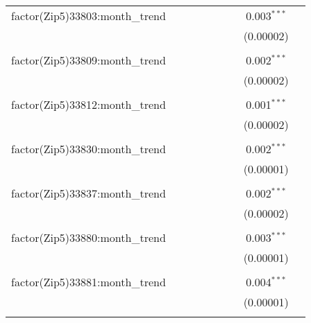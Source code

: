 \begin{table}[H]
{\begin{tabular}{@{\extracolsep{5pt}}lcccccccc}
  factor(Zip5)33803:month\_trend &  &  &  &  &  &  & 0.003$^{***}$ &  \\  

   &  &  &  &  &  &  & (0.00002) &  \\  

   & & & & & & & & \\  

  factor(Zip5)33809:month\_trend &  &  &  &  &  &  & 0.002$^{***}$ &  \\  

   &  &  &  &  &  &  & (0.00002) &  \\  

   & & & & & & & & \\  

  factor(Zip5)33812:month\_trend &  &  &  &  &  &  & 0.001$^{***}$ &  \\  

   &  &  &  &  &  &  & (0.00002) &  \\  

   & & & & & & & & \\  

  factor(Zip5)33830:month\_trend &  &  &  &  &  &  & 0.002$^{***}$ &  \\  

   &  &  &  &  &  &  & (0.00001) &  \\  

   & & & & & & & & \\  

  factor(Zip5)33837:month\_trend &  &  &  &  &  &  & 0.002$^{***}$ &  \\  

   &  &  &  &  &  &  & (0.00002) &  \\  

   & & & & & & & & \\  

  factor(Zip5)33880:month\_trend &  &  &  &  &  &  & 0.003$^{***}$ &  \\  

   &  &  &  &  &  &  & (0.00001) &  \\  

   & & & & & & & & \\  

  factor(Zip5)33881:month\_trend &  &  &  &  &  &  & 0.004$^{***}$ &  \\  

   &  &  &  &  &  &  & (0.00001) &  \\  

   & & & & & & & & \\  


\end{tabular}}
\end{table}

